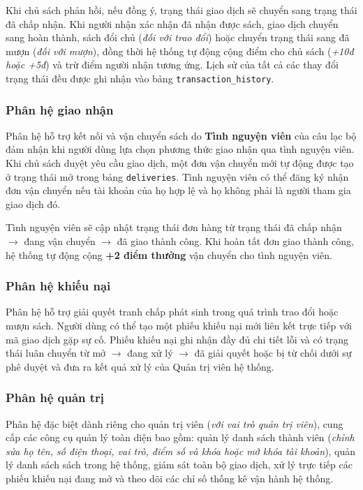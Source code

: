 Khi chủ sách phản hồi, nếu đồng ý, trạng thái giao dịch sẽ chuyển sang trạng thái đã chấp nhận. Khi người nhận xác nhận đã nhận được sách, giao dịch chuyển sang hoàn thành, sách đổi chủ (\textit{đối với trao đổi}) hoặc chuyển trạng thái sang đã mượn (\textit{đối với mượn}), đồng thời hệ thống tự động cộng điểm cho chủ sách (\textit{+10đ hoặc +5đ}) và trừ điểm người nhận tương ứng. Lịch sử của tất cả các thay đổi trạng thái đều được ghi nhận vào bảng \texttt{transaction\_history}.

\subsubsection{Phân hệ giao nhận}
Phân hệ hỗ trợ kết nối và vận chuyển sách do \textbf{Tình nguyện viên} của câu lạc bộ đảm nhận khi người dùng lựa chọn phương thức giao nhận qua tình nguyện viên. Khi chủ sách duyệt yêu cầu giao dịch, một đơn vận chuyển mới tự động được tạo ở trạng thái mở trong bảng \texttt{deliveries}. Tình nguyện viên có thể đăng ký nhận đơn vận chuyển nếu tài khoản của họ hợp lệ và họ không phải là người tham gia giao dịch đó. 

Tình nguyện viên sẽ cập nhật trạng thái đơn hàng từ trạng thái đã chấp nhận $\rightarrow$ đang vận chuyển $\rightarrow$ đã giao thành công. Khi hoàn tất đơn giao thành công, hệ thống tự động cộng \textbf{+2 điểm thưởng} vận chuyển cho tình nguyện viên.

\subsubsection{Phân hệ khiếu nại}
Phân hệ hỗ trợ giải quyết tranh chấp phát sinh trong quá trình trao đổi hoặc mượn sách. Người dùng có thể tạo một phiếu khiếu nại mới liên kết trực tiếp với mã giao dịch gặp sự cố. Phiếu khiếu nại ghi nhận đầy đủ chi tiết lỗi và có trạng thái luân chuyển từ mở $\rightarrow$ đang xử lý $\rightarrow$ đã giải quyết hoặc bị từ chối dưới sự phê duyệt và đưa ra kết quả xử lý của Quản trị viên hệ thống.

\subsubsection{Phân hệ quản trị}
Phân hệ đặc biệt dành riêng cho quản trị viên (\textit{với vai trò quản trị viên}), cung cấp các công cụ quản lý toàn diện bao gồm: quản lý danh sách thành viên (\textit{chỉnh sửa họ tên, số điện thoại, vai trò, điểm số và khóa hoặc mở khóa tài khoản}), quản lý danh sách sách trong hệ thống, giám sát toàn bộ giao dịch, xử lý trực tiếp các phiếu khiếu nại đang mở và theo dõi các chỉ số thống kê vận hành hệ thống.
